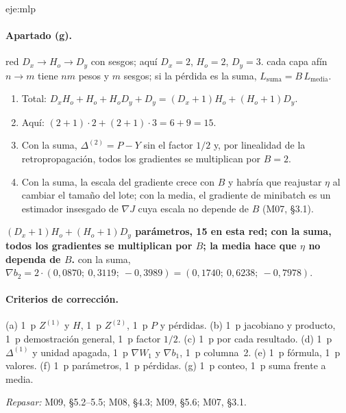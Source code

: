 \begin{solucion}{eje:mlp}
\paragraph{Apartado (g).}
\datos red $D_x\to H_o\to D_y$ con sesgos; aquí $D_x=2$, $H_o=2$, $D_y=3$.
\planteamiento cada capa afín $n\to m$ tiene $nm$ pesos y $m$ sesgos; si la pérdida es la suma, $L_{\text{suma}}=B\,L_{\text{media}}$.
\pasos
\begin{enumerate}[label=\arabic*.]
  \item Total: $D_xH_o+H_o+H_oD_y+D_y=(D_x+1)H_o+(H_o+1)D_y$.
  \item Aquí: $(2+1)\cdot 2+(2+1)\cdot 3=6+9=15$.
  \item Con la suma, $\Delta^{(2)}=P-Y$ sin el factor $1/2$ y, por linealidad de la retropropagación, todos los gradientes se multiplican por $B=2$.
  \item Con la suma, la escala del gradiente crece con $B$ y habría que reajustar $\eta$ al cambiar el tamaño del lote; con la media, el gradiente de minibatch es un estimador insesgado de $\nabla J$ cuya escala no depende de $B$ (M07, §3.1).
\end{enumerate}
\resultado \textbf{$(D_x+1)H_o+(H_o+1)D_y$ parámetros, 15 en esta red; con la suma, todos los gradientes se multiplican por $B$; la media hace que $\eta$ no dependa de $B$.}
\comprobacion con la suma, $\nabla b_2=2\cdot(0{,}0870;\allowbreak\ 0{,}3119;\allowbreak\ -0{,}3989)=(0{,}1740;\allowbreak\ 0{,}6238;\allowbreak\ -0{,}7978)$.

\paragraph{Criterios de corrección.} (a) 1~p $Z^{(1)}$ y $H$, 1~p $Z^{(2)}$, 1~p $P$ y pérdidas. (b) 1~p jacobiano y producto, 1~p demostración general, 1~p factor $1/2$. (c) 1~p por cada resultado. (d) 1~p $\Delta^{(1)}$ y unidad apagada, 1~p $\nabla W_1$ y $\nabla b_1$, 1~p columna~2. (e) 1~p fórmula, 1~p valores. (f) 1~p parámetros, 1~p pérdidas. (g) 1~p conteo, 1~p suma frente a media.

\textit{Repasar:} M09, §5.2--5.5; M08, §4.3; M09, §5.6; M07, §3.1.
\end{solucion}

